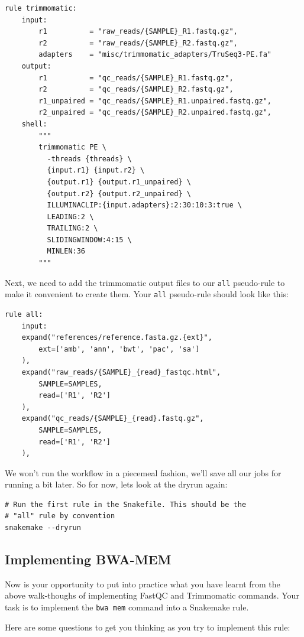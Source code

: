 \begin{lstlisting}
rule trimmomatic:
	input:
		r1          = "raw_reads/{SAMPLE}_R1.fastq.gz",
		r2          = "raw_reads/{SAMPLE}_R2.fastq.gz",
		adapters    = "misc/trimmomatic_adapters/TruSeq3-PE.fa"
	output:
		r1          = "qc_reads/{SAMPLE}_R1.fastq.gz",
		r2          = "qc_reads/{SAMPLE}_R2.fastq.gz",
		r1_unpaired = "qc_reads/{SAMPLE}_R1.unpaired.fastq.gz",
		r2_unpaired = "qc_reads/{SAMPLE}_R2.unpaired.fastq.gz",
	shell:
		"""
		trimmomatic PE \
		  -threads {threads} \
		  {input.r1} {input.r2} \
		  {output.r1} {output.r1_unpaired} \
		  {output.r2} {output.r2_unpaired} \
		  ILLUMINACLIP:{input.adapters}:2:30:10:3:true \
		  LEADING:2 \
		  TRAILING:2 \
		  SLIDINGWINDOW:4:15 \
		  MINLEN:36
		"""
\end{lstlisting}

Next, we need to add the trimmomatic output files to our \texttt{all} pseudo-rule to make it convenient to create them. Your \texttt{all}
pseudo-rule should look like this:

\begin{lstlisting}
rule all:
	input:
	expand("references/reference.fasta.gz.{ext}",
		ext=['amb', 'ann', 'bwt', 'pac', 'sa']
	),
	expand("raw_reads/{SAMPLE}_{read}_fastqc.html",
		SAMPLE=SAMPLES,
		read=['R1', 'R2']
	),
	expand("qc_reads/{SAMPLE}_{read}.fastq.gz",
		SAMPLE=SAMPLES,
		read=['R1', 'R2']
	),
\end{lstlisting}

We won't run the workflow in a piecemeal fashion, we'll save all our jobs for running a bit later. So for now, lets look at the dryrun again:

\begin{lstlisting}
# Run the first rule in the Snakefile. This should be the
# "all" rule by convention
snakemake --dryrun
\end{lstlisting}

\subsection{Implementing BWA-MEM}

Now is your opportunity to put into practice what you have learnt from the above walk-thoughs of implementing
FastQC and Trimmomatic commands. Your task is to implement the \texttt{bwa mem} command into a Snakemake rule.

Here are some questions to get you thinking as you try to implement this rule:

